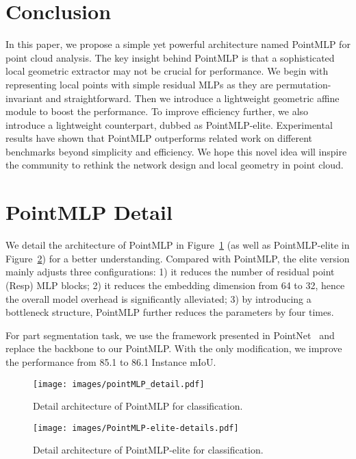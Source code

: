 \documentclass{article} \usepackage{iclr2022_conference,times}
\begin{document}
\section{Conclusion}
In this paper, we propose a simple yet powerful architecture named PointMLP for point cloud analysis. The key insight behind PointMLP is that a sophisticated local geometric extractor may not be crucial for performance. We begin with representing local points with simple residual MLPs as they are permutation-invariant and straightforward. Then we introduce a lightweight geometric affine module to boost the performance. To improve efficiency further, we also introduce a lightweight counterpart, dubbed as PointMLP-elite. Experimental results have shown that PointMLP outperforms related work on different benchmarks beyond simplicity and efficiency. We hope this novel idea will inspire the community to rethink the network design and local geometry in point cloud.

\newpage






\newpage
\appendix
\section{PointMLP Detail}
We detail the architecture of PointMLP in Figure~\ref{fig:detail_pointmlp} (as well as PointMLP-elite in Figure~\ref{fig:detail_pointmlp_elite}) for a better understanding. Compared with PointMLP, the elite version mainly adjusts three configurations: 1) it reduces the number of residual point (Resp) MLP blocks; 2) it reduces the embedding dimension from 64 to 32, hence the overall model overhead is significantly alleviated; 3) by introducing a bottleneck structure, PointMLP further reduces the parameters by four times.

For part segmentation task, we use the framework presented in PointNet~\citep{qi2017pointnet} and replace the backbone to our PointMLP. With the only modification, we improve the performance from 85.1 to 86.1 Instance mIoU.

\begin{figure}[!h]
    \centering
    \texttt{[image: images/pointMLP\_detail.pdf]}
    \caption{Detail architecture of PointMLP for classification.}
    \label{fig:detail_pointmlp}
\end{figure}
\begin{figure}[!h]
    \centering
    \texttt{[image: images/PointMLP-elite-details.pdf]}
    \caption{Detail architecture of PointMLP-elite for classification.}
    \label{fig:detail_pointmlp_elite}
\end{figure}
\end{document}
